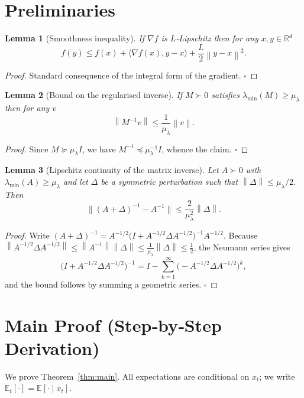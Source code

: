 \documentclass{article}
\newtheorem{lemma}{Lemma}
\newcommand{\E}{\mathbb{E}}
\newcommand{\R}{\mathbb{R}}
\newcommand{\norm}[1]{\left\|#1\right\|}
\newcommand{\inner}[2]{\langle #1,#2\rangle}
\begin{document}
\section*{Preliminaries}
\begin{lemma}[Smoothness inequality]\label{lem:smooth}
If $\nabla f$ is $L$‑Lipschitz then for any $x,y\in\R^{d}$
\[
f(y)\le f(x)+\inner{\nabla f(x)}{y-x}+ \frac{L}{2}\norm{y-x}^{2}. \tag{L1}
\]
\end{lemma}
\begin{proof}
Standard consequence of the integral form of the gradient. \hfill $\square$
\end{proof}

\begin{lemma}[Bound on the regularised inverse]\label{lem:inv}
If $M\succ0$ satisfies $\lambda_{\min}(M)\ge \mu_{\lambda}$ then for any $v$
\[
\norm{M^{-1}v}\le \frac{1}{\mu_{\lambda}}\norm{v}. \tag{L2}
\]
\end{lemma}
\begin{proof}
Since $M\succeq \mu_{\lambda} I$, we have $M^{-1}\preceq \mu_{\lambda}^{-1} I$, whence the claim. \hfill $\square$
\end{proof}

\begin{lemma}[Lipschitz continuity of the matrix inverse]\label{lem:inv_lip}
Let $A\succ0$ with $\lambda_{\min}(A)\ge\mu_{\lambda}$ and let $\Delta$ be a symmetric perturbation such that $\norm{\Delta}\le \mu_{\lambda}/2$. Then
\[
\bigl\|(A+\Delta)^{-1}-A^{-1}\bigr\|\le \frac{2}{\mu_{\lambda}^{2}}\norm{\Delta}. \tag{L3}
\]
\end{lemma}
\begin{proof}
Write $(A+\Delta)^{-1}=A^{-1/2}\bigl(I+A^{-1/2}\Delta A^{-1/2}\bigr)^{-1}A^{-1/2}$.
Because $\norm{A^{-1/2}\Delta A^{-1/2}}\le \norm{A^{-1}}\norm{\Delta}\le \frac{1}{\mu_{\lambda}}\norm{\Delta}\le \tfrac12$, the Neumann series gives
\[
\bigl(I+A^{-1/2}\Delta A^{-1/2}\bigr)^{-1}
= I-\sum_{k=1}^{\infty}\bigl(-A^{-1/2}\Delta A^{-1/2}\bigr)^{k},
\]
and the bound follows by summing a geometric series. \hfill $\square$
\end{proof}

\section*{Main Proof (Step‑by‑Step Derivation)}
We prove Theorem~\ref{thm:main}. All expectations are conditional on $x_{t}$; we write $\E_{t}[\cdot]=\E[\cdot\mid x_{t}]$.
\end{document}
